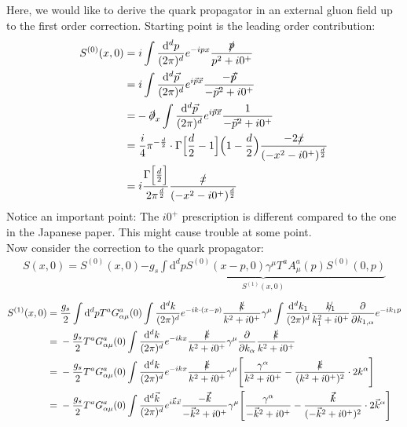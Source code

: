 \documentclass[openright,twoside,12pt,a4paper,final]{article}
\begin{document}
	\noindent
	Here, we would like to derive the quark propagator in an external gluon field up to the first order correction. Starting point is the leading order contribution:
	\begin{align}
		S^{(0)} (x,0) =& \; i \int \frac{\mathrm{d}^dp}{(2 \pi)^d} e^{-ipx} \frac{\slashed{p}}{p^2 + i 0^+} \nonumber \\ =& \; i \int \frac{\mathrm{d}^d \vec{p}}{(2 \pi)^d} e^{i\vec{p} \vec{x}} \frac{- \slashed{\vec{p}}}{- \vec{p}^2 + i 0^+} \nonumber \\ =& - \slashed{\partial}_x \int \frac{\mathrm{d}^d \vec{p}}{(2 \pi)^d} e^{i\vec{p} \vec{x}} \frac{1}{- \vec{p}^2 + i 0^+} \nonumber \\ =& \; \frac{i}{4} \pi^{-\frac{d}{2}} \cdot \Gamma\Big[\frac{d}{2} - 1\Big] \Big(1 - \frac{d}{2}\Big) \frac{-2 \slashed{x}}{(-x^2 - i0^+)^{\frac{d}{2}}} \nonumber \\ =& \; i \frac{\Gamma\Big[\frac{d}{2}\Big]}{2 \pi^{\frac{d}{2}}} \frac{\slashed{x}}{(-x^2 - i0^+)^{\frac{d}{2}}}
	\end{align}
	Notice an important point: The $i0^+$ prescription is different compared to the one in the Japanese paper. This might cause trouble at some point. \\
	Now consider the correction to the quark propagator:
	\begin{align}
		S(x,0) = S^{(0)}(x,0) \underbrace{-g_s \int \mathrm{d}^d p S^{(0)}(x - p,0) \gamma^{\mu} T^a A^a_{\mu}(p) S^{(0)}(0,p)}_{S^{(1)}(x,0)}
	\end{align}
	\begin{align}
		S^{(1)}(x,0) =& \; \frac{g_s}{2} \int \mathrm{d}^d p T^a G^a_{\alpha \mu}(0) \int \frac{\mathrm{d}^dk}{(2 \pi)^d} e^{-ik\cdot(x - p)} \frac{\slashed{k}}{k^2 + i0^+} \gamma^{\mu} \int \frac{\mathrm{d}^dk_1}{(2 \pi)^d} \frac{\slashed{k_1}}{k_1^2 + i0^+} \frac{\partial}{\partial k_{1,\alpha}} e^{-ik_1p} \nonumber \\ =& \; - \frac{g_s}{2} T^a G^a_{\alpha \mu}(0) \int \frac{\mathrm{d}^dk}{(2 \pi)^d} e^{-ikx} \frac{\slashed{k}}{k^2 + i0^+} \gamma^{\mu} \frac{\partial}{\partial k_{\alpha}} \frac{\slashed{k}}{k^2 + i0^+} \nonumber \\ =& \; - \frac{g_s}{2} T^a G^a_{\alpha \mu}(0) \int \frac{\mathrm{d}^dk}{(2 \pi)^d} e^{-ikx} \frac{\slashed{k}}{k^2 + i0^+} \gamma^{\mu} \Bigg[ \frac{\gamma^{\alpha}}{k^2 + i0^+} - \frac{\slashed{k}}{(k^2 + i0^+)^2} \cdot 2 k^{\alpha}\Bigg] \nonumber \\ =& \; - \frac{g_s}{2} T^a G^a_{\alpha \mu}(0) \int \frac{\mathrm{d}^d\vec{k}}{(2 \pi)^d} e^{i\vec{k}\vec{x}} \frac{-\slashed{\vec{k}}}{-\vec{k}^2 + i0^+} \gamma^{\mu} \Bigg[ \frac{\gamma^{\alpha}}{-\vec{k}^2 + i0^+} - \frac{\slashed{\vec{k}}}{(-\vec{k}^2 + i0^+)^2} \cdot 2 \vec{k}^{\alpha}\Bigg] \nonumber
	\end{align}
\end{document}
